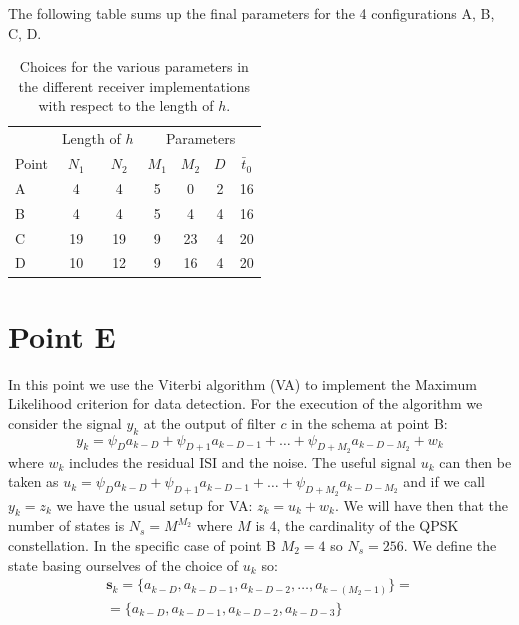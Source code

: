 \documentclass[a4paper,11.5pt]{article}
\newcommand{\vt}{\boldsymbol}
\begin{document}
The following table sums up the final parameters for the 4 configurations A, B, C, D.

\begin{table}[htbp]
	\begin{center}
		\begin{tabular}{p{2.7cm}cccccc}
			\toprule
			& \multicolumn{2}{c}{Length of $h$} & \multicolumn{4}{c}{Parameters} \\
			\cmidrule(lr){2-3}
			\cmidrule(lr){4-7}
			Point & $N_1$ & $N_2$ & $M_1$ & $M_2$ & $D$ & $\bar{t}_0$ \\
			\midrule
			A &  4  &  4  & 5 & 0  & 2 & 16 \\
			B &  4  &  4  & 5 & 4  & 4 & 16 \\
			C & 19  &  19 & 9 & 23 & 4 & 20 \\
			D & 10  &  12 & 9 & 16 & 4 & 20 \\
			\bottomrule
		\end{tabular}
	\end{center}
	\label{tab:sumup}
	\caption{Choices for the various parameters in the different receiver implementations with respect to the length of $h$.}
\end{table} 

\section*{Point E}

In this point we use the Viterbi algorithm (VA) to implement the Maximum Likelihood criterion for data detection. 
For the execution of the algorithm we consider the signal $y_k$ at the output of filter $c$ in the schema at point B:
\begin{equation}
y_k = \psi_D a_{k-D} + \psi_{D+1} a_{k-D-1} + \dots +\psi_{D+M_2} a_{k-D-M_2} + w_k
\end{equation}
where $w_k$ includes the residual ISI and the noise. The useful signal $u_k$ can then be taken as $u_k=\psi_D a_{k-D} + \psi_{D+1} a_{k-D-1} + \dots +\psi_{D+M_2} a_{k-D-M_2}$ and if we call $y_k=z_k$ we have the usual setup for VA: $z_k = u_k+w_k$. We will have then that the number of states is $N_s=M^{M_2}$ where $M$ is 4, the cardinality of the QPSK constellation. In the specific case of point B $M_2=4$ so $N_s=256$. We define the state basing ourselves of the choice of $u_k$ so:
\begin{equation}
\begin{split}
\vt{s}_k = \{a_{k-D}, a_{k-D-1}, a_{k-D-2}, \dots, a_{k-(M_2-1)}\} = \\
= \{a_{k-D}, a_{k-D-1}, a_{k-D-2}, a_{k-D-3}\}
\end{split}
\end{equation}
\end{document}
